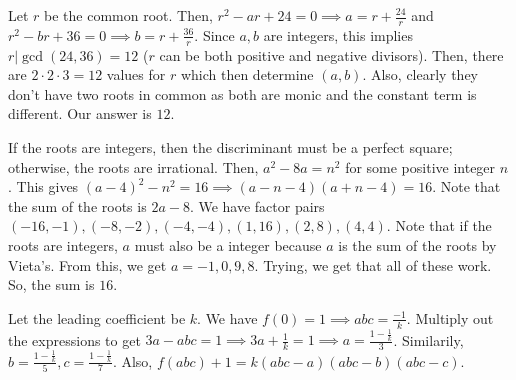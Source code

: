 \documentclass[11pt]{article}
\begin{document}
\begin{sol}
Let $r$ be the common root. Then, $r^2-ar+24=0\implies a = r + \frac{24}{r}$ and $r^2-br+36=0\implies b = r + \frac{36}{r}$. Since $a,b$ are integers, this implies $r|\gcd(24,36)=12$ ($r$ can be both positive and negative divisors). Then, there are $2\cdot 2\cdot 3 =12$ values for $r$ which then determine $(a,b)$. Also, clearly they don't have two roots in common as both are monic and the constant term is different. Our answer is $\boxed{12}$.
\end{sol}


\begin{sol}
If the roots are integers, then the discriminant must be a perfect square; otherwise, the roots are irrational. Then, $a^2-8a=n^2$ for some positive integer $n$. This gives $(a-4)^2-n^2=16\implies (a-n-4)(a+n-4)=16$. Note that the sum of the roots is $2a-8$. We have factor pairs $(-16,-1),(-8,-2),(-4,-4),(1,16),(2,8),(4,4)$. Note that if the roots are integers, $a$ must also be a integer because $a$ is the sum of the roots by Vieta's. From this, we get $a=-1, 0, 9, 8$. Trying, we get that all of these work. So, the sum is $\boxed{16}$.
\end{sol}



\begin{sol} 
Let the leading coefficient be $k$. We have $f(0)=1\implies abc=\frac{-1}{k}$. Multiply out the expressions to get $3a-abc=1\implies 3a+\frac{1}{k}=1\implies a = \frac{1-\frac{1}{k}}{3}$. Similarily, $b=\frac{1-\frac{1}{k}}{5}, c= \frac{1-\frac{1}{k}}{7}$.  Also, $f(abc)+1=k(abc-a)(abc-b)(abc-c)$.
\end{sol}

\end{document}
